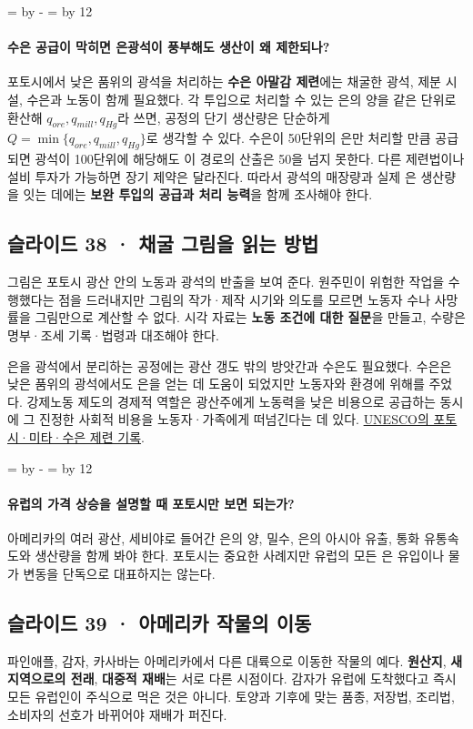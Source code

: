 \documentclass[10pt,a4paper]{article}
\newcommand{\ReserveQuestionSpace}{%
  \par\begingroup
  \dimen0=\pagegoal \advance\dimen0 by -\pagetotal
  \dimen2=\baselineskip \multiply\dimen2 by 12
  \ifdim\dimen0<\dimen2 \newpage\fi
  \endgroup}
\begin{document}
\ReserveQuestionSpace
\paragraph{수은 공급이 막히면 은광석이 풍부해도 생산이 왜 제한되나?}
포토시에서 낮은 품위의 광석을 처리하는 \textbf{수은 아말감 제련}에는 채굴한 광석, 제분 시설, 수은과 노동이 함께 필요했다. 각 투입으로 처리할 수 있는 은의 양을 같은 단위로 환산해 $q_{ore},q_{mill},q_{Hg}$라 쓰면, 공정의 단기 생산량은 단순하게 $Q=\min\{q_{ore},q_{mill},q_{Hg}\}$로 생각할 수 있다. 수은이 50단위의 은만 처리할 만큼 공급되면 광석이 100단위에 해당해도 이 경로의 산출은 50을 넘지 못한다. 다른 제련법이나 설비 투자가 가능하면 장기 제약은 달라진다. 따라서 광석의 매장량과 실제 은 생산량을 잇는 데에는 \textbf{보완 투입의 공급과 처리 능력}을 함께 조사해야 한다.\par

\subsection{슬라이드 38 · 채굴 그림을 읽는 방법}
그림은 포토시 광산 안의 노동과 광석의 반출을 보여 준다. 원주민이 위험한 작업을 수행했다는 점을 드러내지만 그림의 작가·제작 시기와 의도를 모르면 노동자 수나 사망률을 그림만으로 계산할 수 없다. 시각 자료는 \textbf{노동 조건에 대한 질문}을 만들고, 수량은 명부·조세 기록·법령과 대조해야 한다.\par

은을 광석에서 분리하는 공정에는 광산 갱도 밖의 방앗간과 수은도 필요했다. 수은은 낮은 품위의 광석에서도 은을 얻는 데 도움이 되었지만 노동자와 환경에 위해를 주었다. 강제노동 제도의 경제적 역할은 광산주에게 노동력을 낮은 비용으로 공급하는 동시에 그 진정한 사회적 비용을 노동자·가족에게 떠넘긴다는 데 있다. \href{https://whc.unesco.org/en/list/420}{UNESCO의 포토시·미타·수은 제련 기록}.\par

\ReserveQuestionSpace
\paragraph{유럽의 가격 상승을 설명할 때 포토시만 보면 되는가?}
아메리카의 여러 광산, 세비야로 들어간 은의 양, 밀수, 은의 아시아 유출, 통화 유통속도와 생산량을 함께 봐야 한다. 포토시는 중요한 사례지만 유럽의 모든 은 유입이나 물가 변동을 단독으로 대표하지는 않는다.\par

\subsection{슬라이드 39 · 아메리카 작물의 이동}
파인애플, 감자, 카사바는 아메리카에서 다른 대륙으로 이동한 작물의 예다. \textbf{원산지}, \textbf{새 지역으로의 전래}, \textbf{대중적 재배}는 서로 다른 시점이다. 감자가 유럽에 도착했다고 즉시 모든 유럽인이 주식으로 먹은 것은 아니다. 토양과 기후에 맞는 품종, 저장법, 조리법, 소비자의 선호가 바뀌어야 재배가 퍼진다.\par
\end{document}
